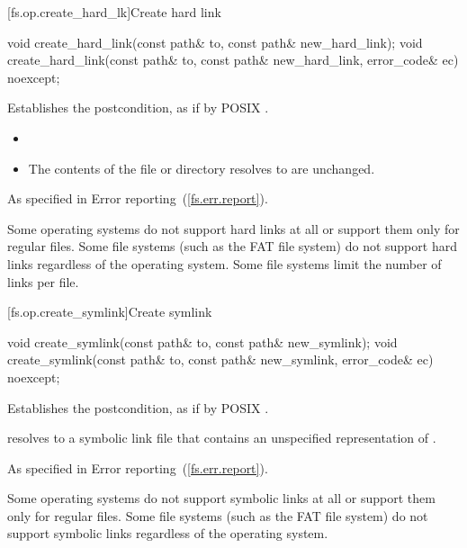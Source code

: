 [fs.op.create_hard_lk]{Create hard link}

\begin{itemdecl}
void create_hard_link(const path& to, const path& new_hard_link);
void create_hard_link(const path& to, const path& new_hard_link,
                                      error_code& ec) noexcept;
\end{itemdecl}

\begin{itemdescr}
\pnum
\effects Establishes the postcondition, as if by POSIX .

\pnum
\postcondition
\begin{itemize}
\item {}
\item The contents of the file or directory
     resolves to are unchanged.
\end{itemize}

\pnum
\throws As specified in Error reporting~(\ref{fs.err.report}).

\pnum
\enternote Some operating systems do not support hard links at all or support
  them only for regular files. Some file systems (such as the FAT file system)
  do not support hard links regardless of the operating system.
  Some file systems limit the number of links per file. \exitnote
\end{itemdescr}

[fs.op.create_symlink]{Create symlink}

\begin{itemdecl}
void create_symlink(const path& to, const path& new_symlink);
void create_symlink(const path& to, const path& new_symlink,
                    error_code& ec) noexcept;
\end{itemdecl}

\begin{itemdescr}
\pnum
\effects Establishes the postcondition, as if by POSIX .

\pnum
\postcondition {} resolves to a symbolic link file that
  contains an unspecified representation of .

\pnum
\throws As specified in Error reporting~(\ref{fs.err.report}).

\pnum
\enternote Some operating systems do not support symbolic links at all or support
  them only for regular files.
  Some file systems (such as the FAT file system) do not
  support symbolic links regardless of the operating system. \exitnote
\end{itemdescr}


